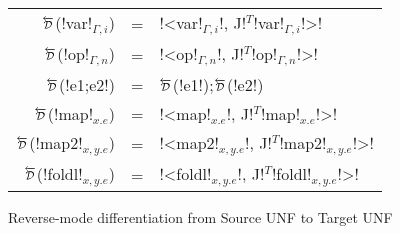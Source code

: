 \begin{figure*}[t]
    \begin{tabular}{r c l}
    $\Dsynrevsymbol$(!var!$_{\Gamma,i}$) &=& !<var!$_{\Gamma,i}$!, J!$^T$!var!$_{\Gamma,i}$!>! \\
    $\Dsynrevsymbol$(!op!$_{\Gamma,n}$) &=& !<op!$_{\Gamma,n}$!, J!$^T$!op!$_{\Gamma,n}$!>! \\ 
    $\Dsynrevsymbol$(!e1;e2!) &=& $\Dsynrevsymbol$(!e1!);$\Dsynrevsymbol$(!e2!)\\ 
    $\Dsynrevsymbol$(!map!$_{x.e}$) &=& !<map!$_{x.e}$!, J!$^T$!map!$_{x.e}$!>! \\ 
    $\Dsynrevsymbol$(!map2!$_{x,y.e}$) &=& !<map2!$_{x,y.e}$!, J!$^T$!map2!$_{x,y.e}$!>! \\ 
    $\Dsynrevsymbol$(!foldl!$_{x,y.e}$) &=& !<foldl!$_{x,y.e}$!, J!$^T$!foldl!$_{x,y.e}$!>! \\  
    \end{tabular}
    \caption{Reverse-mode differentiation from Source UNF to Target UNF}
    \label{fig:diff_macro}    \end{figure*}